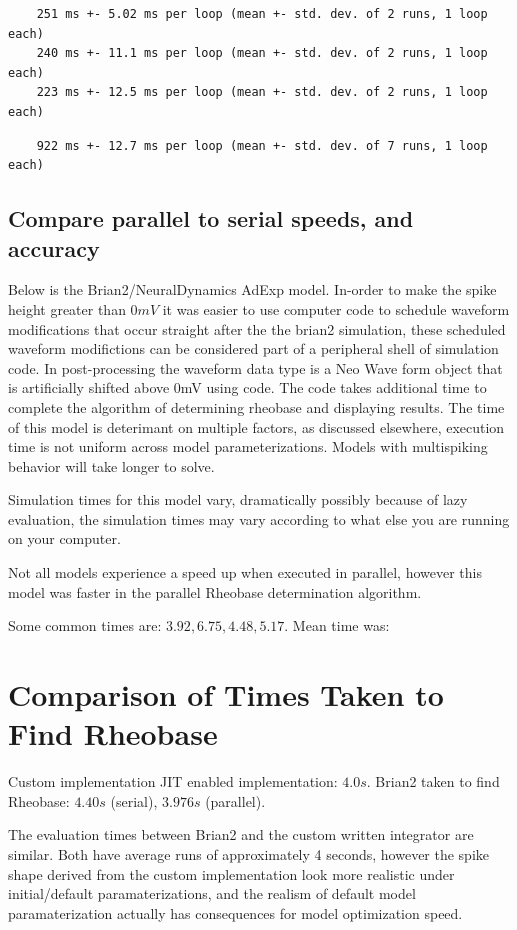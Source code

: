 \begin{verbatim}
    251 ms +- 5.02 ms per loop (mean +- std. dev. of 2 runs, 1 loop each)
    240 ms +- 11.1 ms per loop (mean +- std. dev. of 2 runs, 1 loop each)
    223 ms +- 12.5 ms per loop (mean +- std. dev. of 2 runs, 1 loop each)
\end{verbatim}

\begin{verbatim}
    922 ms +- 12.7 ms per loop (mean +- std. dev. of 7 runs, 1 loop each)
\end{verbatim}

\subsection{Compare parallel to serial speeds, and accuracy}

Below is the Brian2/NeuralDynamics AdExp model. In-order to make the spike height greater than $0mV$ it was easier to use computer code to schedule waveform modifications that occur straight after the the brian2 simulation, these scheduled waveform modifictions can be considered part of a peripheral shell of simulation code. In post-processing
the waveform data type is a Neo Wave form object that is artificially
shifted above 0mV using code. The code takes additional time to complete
the algorithm of determining rheobase and displaying results. The time
of this model is deterimant on multiple factors, as discussed elsewhere,
execution time is not uniform across model parameterizations. Models
with multispiking behavior will take longer to solve.

Simulation times for this model vary, dramatically possibly because of
lazy evaluation, the simulation times may vary according to what else
you are running on your computer.

Not all models experience a speed up when executed in parallel, however
this model was faster in the parallel Rheobase determination algorithm.

Some common times are: $3.92,6.75,4.48,5.17$. Mean time was:

\section{Comparison of Times Taken to Find Rheobase}
Custom implementation JIT enabled implementation: $4.0s$. 
Brian2 taken to find Rheobase: $4.40s$ (serial), $3.976s$ (parallel).

The evaluation times between Brian2 and the custom written
integrator are similar. Both have average runs of approximately 4 seconds, however the spike shape derived from the custom implementation look more realistic under initial/default paramaterizations, and the realism of default model paramaterization actually has consequences for model optimization speed.\\

